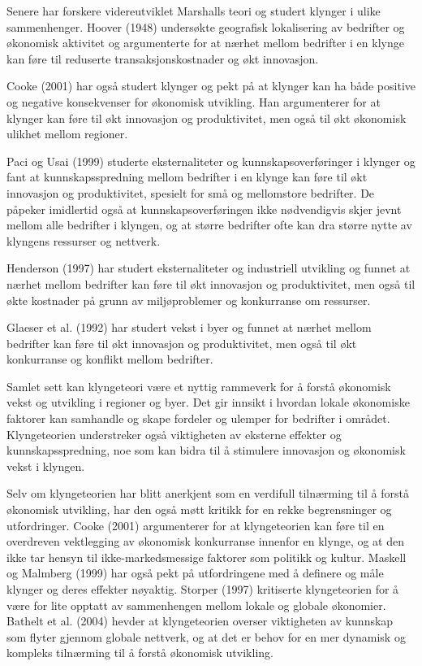 \documentclass[
]{article}
\begin{document}
Senere har forskere videreutviklet Marshalls teori og studert klynger i
ulike sammenhenger. Hoover (1948) undersøkte geografisk lokalisering av
bedrifter og økonomisk aktivitet og argumenterte for at nærhet mellom
bedrifter i en klynge kan føre til reduserte transaksjonskostnader og
økt innovasjon.

Cooke (2001) har også studert klynger og pekt på at klynger kan ha både
positive og negative konsekvenser for økonomisk utvikling. Han
argumenterer for at klynger kan føre til økt innovasjon og
produktivitet, men også til økt økonomisk ulikhet mellom regioner.

Paci og Usai (1999) studerte eksternaliteter og kunnskapsoverføringer i
klynger og fant at kunnskapsspredning mellom bedrifter i en klynge kan
føre til økt innovasjon og produktivitet, spesielt for små og
mellomstore bedrifter. De påpeker imidlertid også at
kunnskapsoverføringen ikke nødvendigvis skjer jevnt mellom alle
bedrifter i klyngen, og at større bedrifter ofte kan dra større nytte av
klyngens ressurser og nettverk.

Henderson (1997) har studert eksternaliteter og industriell utvikling og
funnet at nærhet mellom bedrifter kan føre til økt innovasjon og
produktivitet, men også til økte kostnader på grunn av miljøproblemer og
konkurranse om ressurser.

Glaeser et al. (1992) har studert vekst i byer og funnet at nærhet
mellom bedrifter kan føre til økt innovasjon og produktivitet, men også
til økt konkurranse og konflikt mellom bedrifter.

Samlet sett kan klyngeteori være et nyttig rammeverk for å forstå
økonomisk vekst og utvikling i regioner og byer. Det gir innsikt i
hvordan lokale økonomiske faktorer kan samhandle og skape fordeler og
ulemper for bedrifter i området. Klyngeteorien understreker også
viktigheten av eksterne effekter og kunnskapsspredning, noe som kan
bidra til å stimulere innovasjon og økonomisk vekst i klyngen.

Selv om klyngeteorien har blitt anerkjent som en verdifull tilnærming
til å forstå økonomisk utvikling, har den også møtt kritikk for en rekke
begrensninger og utfordringer. Cooke (2001) argumenterer for at
klyngeteorien kan føre til en overdreven vektlegging av økonomisk
konkurranse innenfor en klynge, og at den ikke tar hensyn til
ikke-markedsmessige faktorer som politikk og kultur. Maskell og Malmberg
(1999) har også pekt på utfordringene med å definere og måle klynger og
deres effekter nøyaktig. Storper (1997) kritiserte klyngeteorien for å
være for lite opptatt av sammenhengen mellom lokale og globale
økonomier. Bathelt et al. (2004) hevder at klyngeteorien overser
viktigheten av kunnskap som flyter gjennom globale nettverk, og at det
er behov for en mer dynamisk og kompleks tilnærming til å forstå
økonomisk utvikling.
\end{document}
